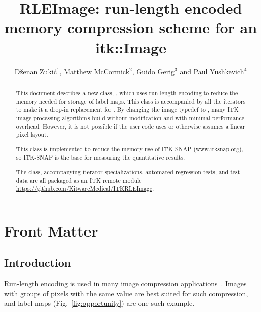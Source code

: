 \documentclass{InsightArticle}
\title{RLEImage: run-length encoded memory compression scheme for an itk::Image}
\author{D{\v z}enan Zuki{\' c}$^{1}$, Matthew McCormick$^{2}$, Guido Gerig$^{3}$ and Paul Yushkevich$^{4}$}
\newcommand{\IJhandlerIDnumber}{1338}
\begin{document}
\IJhandlefooter{\IJhandlerIDnumber}

\ifpdf
\else
\fi

\maketitle

\ifhtml
\chapter*{Front Matter\label{front}}
\fi


\begin{abstract}
\noindent
This document describes a new class, ,
which uses run-length encoding to reduce the memory needed for storage of label maps.
This class is accompanied by all the iterators
to make it a drop-in replacement for .
By changing the image typedef to ,
many ITK image processing algorithms build without modification and
with minimal performance overhead.
However, it is not possible if the user code
uses  or otherwise assumes a linear pixel layout.

This class is implemented to reduce the memory use of ITK-SNAP (\url{www.itksnap.org}),
so ITK-SNAP is the base for measuring the quantitative results.

The class, accompanying iterator specializations, automated regression tests, and test data
are all packaged as an ITK remote module \url{https://github.com/KitwareMedical/ITKRLEImage}.
\end{abstract}

\IJhandlenote{\IJhandlerIDnumber}

\tableofcontents


\section{Introduction}

Run-length encoding is used in many image compression applications~\cite{wikiRLE}.
Images with groups of pixels with the same value are best suited for such compression,
and label maps (Fig.~\ref{fig:opportunity}) are one such example.
\end{document}

